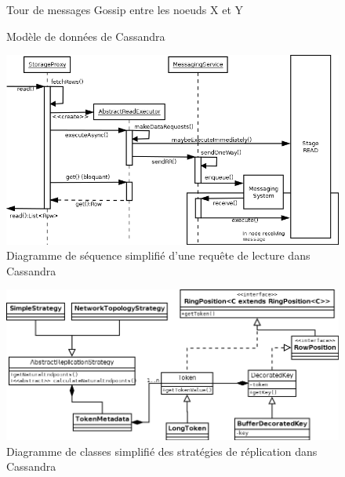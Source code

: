 \documentclass[12pt]{article}
\begin{document}
\begin{figure}[p]
	\centering
		
	\caption{Tour de messages Gossip entre les noeuds X et Y \label{fig:round_gossip}}
\end{figure}

\begin{figure}[p]
	\centering
		
	\caption{Modèle de données de Cassandra \label{fig:keyspace}}
\end{figure}

\begin{figure}[p]
	\centering
		\includegraphics[width=15cm]{images/architecture/read_diagram.png}
	\caption{Diagramme de séquence simplifié d'une requête de lecture dans Cassandra \label{fig:read_diagram}}
\end{figure}

\begin{figure}[p]
	\centering
		\includegraphics[width=15cm]{images/architecture/replication_diagram.png}
	\caption{Diagramme de classes simplifié des stratégies de réplication dans Cassandra \label{fig:replication_diagram}}
\end{figure}

\clearpage
\end{document}

